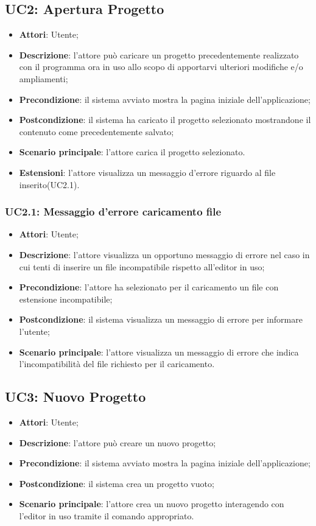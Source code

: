 \subsection{UC2: Apertura Progetto}
\label{UC2}

	\begin{itemize}
		\item \textbf{Attori}: Utente;
		\item \textbf{Descrizione}: l'attore può caricare un progetto precedentemente realizzato con il programma ora in uso allo scopo di apportarvi 		ulteriori modifiche e/o ampliamenti;
		\item \textbf{Precondizione}: il sistema avviato mostra la pagina iniziale dell'applicazione;
		\item \textbf{Postcondizione}: il sistema ha caricato il progetto selezionato mostrandone il contenuto come precedentemente salvato;
		\item \textbf{Scenario principale}:
l'attore carica il progetto selezionato.
		\item \textbf{Estensioni}:
l'attore visualizza un messaggio d'errore riguardo al file inserito(UC2.1).
	\end{itemize}

	\subsubsection{UC2.1: Messaggio d'errore caricamento file}
	\label{UC2.1}
		\begin{itemize}
			\item \textbf{Attori}: Utente;
			\item \textbf{Descrizione}: l'attore visualizza un opportuno messaggio di errore nel caso in cui tenti di inserire un file incompatibile rispetto all'editor in uso;
			\item \textbf{Precondizione}: l'attore ha selezionato per il caricamento un file con estensione incompatibile;
			\item \textbf{Postcondizione}: il sistema visualizza un messaggio di errore per informare l'utente;
			\item \textbf{Scenario principale}: l'attore visualizza un messaggio di errore che indica l'incompatibilità del file richiesto per il caricamento.
		\end{itemize}

\subsection{UC3: Nuovo Progetto}
\label{UC3}
\begin{itemize}
\item \textbf{Attori}: Utente;
\item \textbf{Descrizione}: l'attore può creare un nuovo progetto; 
\item \textbf{Precondizione}: il sistema avviato mostra la pagina iniziale dell'applicazione;
\item \textbf{Postcondizione}: il sistema crea un progetto vuoto;
\item \textbf{Scenario principale}:
l'attore crea un nuovo progetto interagendo con l'editor in uso tramite il comando appropriato.
\end{itemize}

